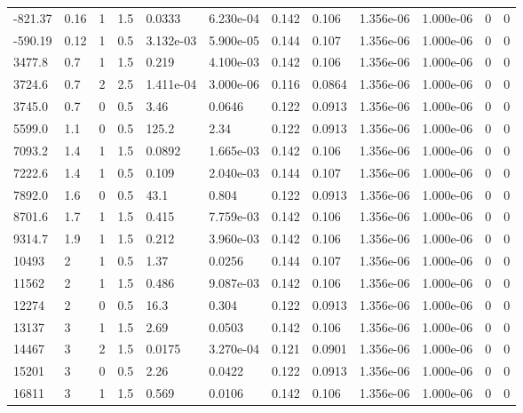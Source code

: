 \documentclass[preview]{standalone}
\begin{document}
{{\begin{tabular}{L{1.2cm}C{1.2cm} C{0.3cm}C{0.5cm} C{1.4cm}C{1.4cm} C{1.4cm}C{1.4cm} C{1.6cm}C{1.6cm} C{1.6cm}C{1.6cm}}
  -821.37  &  0.16  & 1     & 1.5 &  0.0333  & 6.230e-04  &  0.142&   0.106& 1.356e-06 & 1.000e-06   &  0 & 0  \\ 
  -590.19  &  0.12  & 1     & 0.5 &  3.132e-03  & 5.900e-05  &  0.144&   0.107& 1.356e-06 & 1.000e-06   &  0 & 0  \\ 
  3477.8  &   0.7  & 1     & 1.5 &  0.219  & 4.100e-03  &  0.142&   0.106& 1.356e-06 & 1.000e-06   &  0 & 0  \\ 
  3724.6  &   0.7  & 2     & 2.5 &  1.411e-04  & 3.000e-06  &  0.116&   0.0864& 1.356e-06 & 1.000e-06   &  0 & 0  \\ 
  3745.0  &   0.7  & 0     & 0.5 &  3.46  & 0.0646  &  0.122&   0.0913& 1.356e-06 & 1.000e-06   &  0 & 0  \\ 
  5599.0  &   1.1  & 0     & 0.5 &  125.2  & 2.34  &  0.122&   0.0913& 1.356e-06 & 1.000e-06   &  0 & 0  \\ 
  7093.2  &   1.4  & 1     & 1.5 &  0.0892  & 1.665e-03  &  0.142&   0.106& 1.356e-06 & 1.000e-06   &  0 & 0  \\ 
  7222.6  &   1.4  & 1     & 0.5 &  0.109  & 2.040e-03  &  0.144&   0.107& 1.356e-06 & 1.000e-06   &  0 & 0  \\ 
  7892.0  &   1.6  & 0     & 0.5 &  43.1  & 0.804  &  0.122&   0.0913& 1.356e-06 & 1.000e-06   &  0 & 0  \\ 
  8701.6  &   1.7  & 1     & 1.5 &  0.415  & 7.759e-03  &  0.142&   0.106& 1.356e-06 & 1.000e-06   &  0 & 0  \\ 
  9314.7  &   1.9  & 1     & 1.5 &  0.212  & 3.960e-03  &  0.142&   0.106& 1.356e-06 & 1.000e-06   &  0 & 0  \\ 
  10493  &     2  & 1     & 0.5 &  1.37  & 0.0256  &  0.144&   0.107& 1.356e-06 & 1.000e-06   &  0 & 0  \\ 
  11562  &     2  & 1     & 1.5 &  0.486  & 9.087e-03  &  0.142&   0.106& 1.356e-06 & 1.000e-06   &  0 & 0  \\ 
  12274  &     2  & 0     & 0.5 &  16.3  & 0.304  &  0.122&   0.0913& 1.356e-06 & 1.000e-06   &  0 & 0  \\ 
  13137  &     3  & 1     & 1.5 &  2.69  & 0.0503  &  0.142&   0.106& 1.356e-06 & 1.000e-06   &  0 & 0  \\ 
  14467  &     3  & 2     & 1.5 &  0.0175  & 3.270e-04  &  0.121&   0.0901& 1.356e-06 & 1.000e-06   &  0 & 0  \\ 
  15201  &     3  & 0     & 0.5 &  2.26  & 0.0422  &  0.122&   0.0913& 1.356e-06 & 1.000e-06   &  0 & 0  \\ 
  16811  &     3  & 1     & 1.5 &  0.569  & 0.0106  &  0.142&   0.106& 1.356e-06 & 1.000e-06   &  0 & 0  \\ 

\end{tabular}}}
\end{document}
